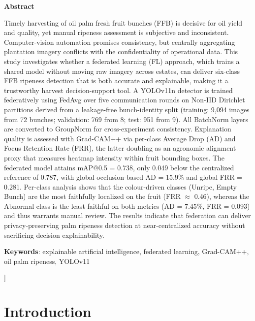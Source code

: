 \documentclass[9pt,twocolumn]{extarticle}
\begin{document}
  \begin{center}
  \begin{minipage}{0.94\textwidth}
    \small
    \textbf{Abstract}

    Timely harvesting of oil palm fresh fruit bunches (FFB) is decisive for oil yield and quality, yet manual ripeness assessment is subjective and inconsistent. Computer-vision automation promises consistency, but centrally aggregating plantation imagery conflicts with the confidentiality of operational data. This study investigates whether a federated learning (FL) approach, which trains a shared model without moving raw imagery across estates, can deliver six-class FFB ripeness detection that is both accurate and explainable, making it a trustworthy harvest decision-support tool. A YOLOv11n detector is trained federatively using FedAvg over five communication rounds on Non-IID Dirichlet partitions derived from a leakage-free bunch-identity split (training: 9,094 images from 72 bunches; validation: 769 from 8; test: 951 from 9). All BatchNorm layers are converted to GroupNorm for cross-experiment consistency. Explanation quality is assessed with Grad-CAM++ via per-class Average Drop (AD) and Focus Retention Rate (FRR), the latter doubling as an agronomic alignment proxy that measures heatmap intensity within fruit bounding boxes. The federated model attains mAP@0.5 = 0.738, only 0.049 below the centralized reference of 0.787, with global occlusion-based AD = 15.9\% and global FRR = 0.281. Per-class analysis shows that the colour-driven classes (Unripe, Empty Bunch) are the most faithfully localized on the fruit (FRR $\approx$ 0.46), whereas the Abnormal class is the least faithful on both metrics (AD = 7.45\%, FRR = 0.093) and thus warrants manual review. The results indicate that federation can deliver privacy-preserving palm ripeness detection at near-centralized accuracy without sacrificing decision explainability.

    \medskip
    \textbf{Keywords}: explainable artificial intelligence, federated learning, Grad-CAM++, oil palm ripeness, YOLOv11
  \end{minipage}
  \end{center}
  \vspace{1.5em}
]

\section{Introduction}
\end{document}
